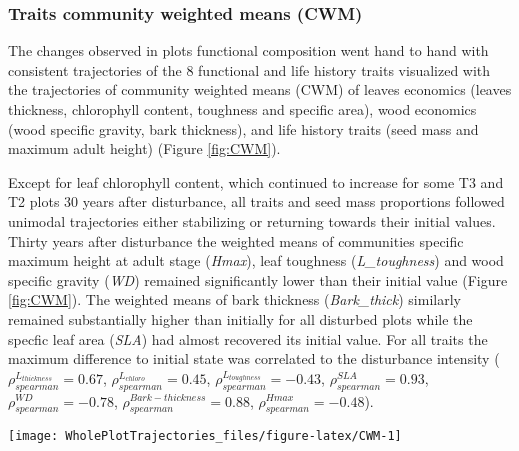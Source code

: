 \documentclass[fleqn,10pt]{ArtEcoFoG} %
\theoremstyle{definition}
\theoremstyle{definition}
\theoremstyle{definition}
\theoremstyle{remark}
\begin{document}
\subsubsection{Traits community weighted means
(CWM)}\label{traits-community-weighted-means-cwm}

The changes observed in plots functional composition went hand to hand
with consistent trajectories of the 8 functional and life history traits
visualized with the trajectories of community weighted means (CWM) of
leaves economics (leaves thickness, chlorophyll content, toughness and
specific area), wood economics (wood specific gravity, bark thickness),
and life history traits (seed mass and maximum adult height) (Figure
\ref{fig:CWM}).

Except for leaf chlorophyll content, which continued to increase for
some T3 and T2 plots 30 years after disturbance, all traits and seed
mass proportions followed unimodal trajectories either stabilizing or
returning towards their initial values. Thirty years after disturbance
the weighted means of communities specific maximum height at adult stage
(\emph{Hmax}), leaf toughness (\emph{L\_toughness}) and wood specific
gravity (\emph{WD}) remained significantly lower than their initial
value (Figure \ref{fig:CWM}). The weighted means of bark thickness
(\emph{Bark\_thick}) similarly remained substantially higher than
initially for all disturbed plots while the specfic leaf area
(\emph{SLA}) had almost recovered its initial value. For all traits the
maximum difference to initial state was correlated to the disturbance
intensity (\(\rho_{spearman}^{L_{thickness}}=0.67\),
\(\rho_{spearman}^{L_{chloro}}=0.45\),
\(\rho_{spearman}^{L_{toughness}}=-0.43\),
\(\rho_{spearman}^{SLA}=0.93\), \(\rho_{spearman}^{WD}=-0.78\),
\(\rho_{spearman}^{Bark-thickness}=0.88\),
\(\rho_{spearman}^{Hmax}=-0.48\)).

\begin{figure*}

{\centering \texttt{[image: WholePlotTrajectories\_files/figure-latex/CWM-1]} 

}

\caption{Trajectories of the communities weighted means (CWM) over 30 years after disturbance of 4 leaf traits (Leaf thickness, \emph{L\_thickness}, chlorophyll content, \emph{L\_chloro}, toughness, \emph{L\_toughness} and specific area, \emph{SLA}), 2 stem traits (wood specific gravity, \emph{WD}, and bark thickness, \emph{Bark-thick}) and one life trait (Specific maximum height at adult stage, \emph{Hmax}). Trajectories correspond to the median (solid line) and 0.025 and 0.975 percentile (gray envelope) observed after 50 iteration of the taxonomic uncertainty propagation and the missing trait value filling processes. Initial treatments are represented by solid lines colors with green for control, blue for T1,orange for T2 and red for T3.}\label{fig:CWM}
\end{figure*}
\end{document}
